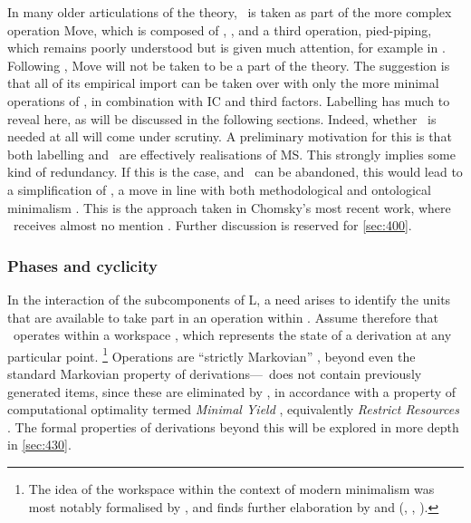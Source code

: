 In many older articulations of the theory, \AGREE\ is taken as part of the more complex operation Move, which is composed of \MERGE, \AGREE, and a third operation, pied-piping, which remains poorly understood but is given much attention, for example in \textcite{ChomskyN_1995}. Following \textcite{ChomskyN_2004}, Move will not be taken to be a part of the theory. The suggestion is that all of its empirical import can be taken over with only the more minimal operations of \CHL, in combination with IC and third factors. Labelling has much to reveal here, as will be discussed in the following sections. Indeed, whether \AGREE\ is needed at all will come under scrutiny. A preliminary motivation for this is that both labelling and \AGREE\ are effectively realisations of MS. This strongly implies some kind of redundancy. If this is the case, and \AGREE\ can be abandoned, this would lead to a simplification of \CHL, a move in line with both methodological  and ontological minimalism . This is the approach taken in Chomsky's most recent work, where \AGREE\ receives almost no mention \parencite{ChomskyN_2021}. Further discussion is reserved for \autoref{sec:400}.

\subsubsection{Phases and cyclicity}\label{sec:145}

In the interaction of the subcomponents of L, a need arises to identify the units that are available to take part in an operation within \CHL. Assume therefore that \CHL\ operates within a workspace \WS, which represents the state of a derivation at any particular point.%
\footnote{The idea of the workspace within the context of modern minimalism was most notably formalised by \textcite{CollinsC.StablerE_2016}, and finds further elaboration by \textcite{ChomskyN.etal_2019} and \citeauthor{ChomskyN_2019a} (\citeyear{ChomskyN_2019a}, \citeyear{ChomskyN_2019b}, \citeyear{ChomskyN_2021}).}
Operations are ``strictly Markovian'' \parencite[20]{ChomskyN_2021}, beyond even the standard Markovian property of derivations---\WS\ does not contain previously generated items, since these are eliminated by \MERGE, in accordance with a property of computational optimality termed \textit{Minimal Yield} \parencite[MY,][19]{ChomskyN_2021}, equivalently \textit{Restrict Resources} \parencite{ChomskyN_2019a}. The formal properties of derivations beyond this will be explored in more depth in \autoref{sec:430}.

